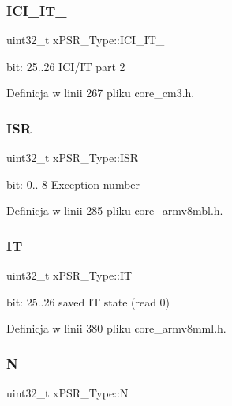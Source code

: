 \subsubsection{\texorpdfstring{I\+C\+I\+\_\+\+I\+T\+\_}{ICI\_IT\_2}}
{\footnotesize\ttfamily uint32\+\_\+t x\+P\+S\+R\+\_\+\+Type\+::\+I\+C\+I\+\_\+\+I\+T\+\_}

bit\+: 25..26 I\+C\+I/\+IT part 2 

Definicja w linii 267 pliku core\+\_\+cm3.\+h.

\mbox{\label{unionx_p_s_r___type_a3e9120dcf1a829fc8d2302b4d0673970}} 
\subsubsection{\texorpdfstring{I\+SR}{ISR}}
{\footnotesize\ttfamily uint32\+\_\+t x\+P\+S\+R\+\_\+\+Type\+::\+I\+SR}

bit\+: 0.. 8 Exception number 

Definicja w linii 285 pliku core\+\_\+armv8mbl.\+h.

\mbox{\label{unionx_p_s_r___type_a3200966922a194d84425e2807a7f1328}} 
\subsubsection{\texorpdfstring{IT}{IT}}
{\footnotesize\ttfamily uint32\+\_\+t x\+P\+S\+R\+\_\+\+Type\+::\+IT}

bit\+: 25..26 saved IT state (read 0) 

Definicja w linii 380 pliku core\+\_\+armv8mml.\+h.

\mbox{\label{unionx_p_s_r___type_a2db9a52f6d42809627d1a7a607c5dbc5}} 
\subsubsection{\texorpdfstring{N}{N}}
{\footnotesize\ttfamily uint32\+\_\+t x\+P\+S\+R\+\_\+\+Type\+::N}

